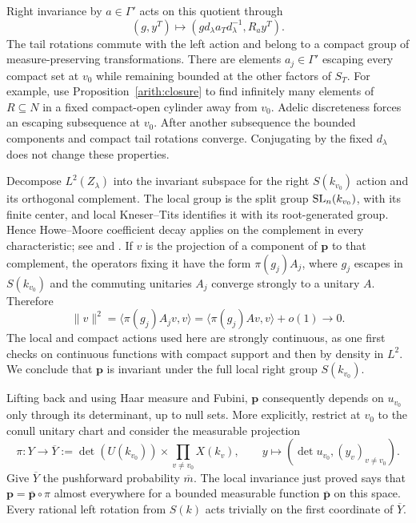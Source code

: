 Right invariance by $a\in\Gamma'$ acts on this quotient through
\[
 (g,y^T)\longmapsto
 (g d_\lambda a_Td_\lambda^{-1},R_a y^T).
\]
The tail rotations commute with the left action and belong to a compact
group of measure-preserving transformations.  There are elements
$a_j\in\Gamma'$ escaping every compact set at $v_0$ while remaining
bounded at the other factors of $S_T$.  For example, use
Proposition~\ref{arith:closure} to find infinitely many elements of
$R\subseteq N$ in a fixed compact-open cylinder away from $v_0$.
Adelic discreteness forces an escaping subsequence at $v_0$.
After another subsequence the bounded components and compact tail
rotations converge.  Conjugating by the fixed $d_\lambda$ does not
change these properties.

Decompose $L^2(Z_\lambda)$ into the invariant subspace for the right
$S(k_{v_0})$ action and its orthogonal complement.  The local group is the split group $\operatorname{SL}_n(k_{v_0})$, with its finite
center, and local Kneser--Tits identifies it with its root-generated
group.  Hence Howe--Moore coefficient decay applies on
the complement in every characteristic; see
\cite{HoweMoore} and \cite[Theorem~4.19]{Ciobotaru}.  If $v$ is the
projection of a component of $\mathbf p$ to that complement, the
operators fixing it have the form $\pi(g_j)A_j$, where $g_j$ escapes
in $S(k_{v_0})$ and the commuting unitaries $A_j$ converge strongly to
a unitary $A$.  Therefore
\[
 \|v\|^2=\langle\pi(g_j)A_jv,v\rangle
 =\langle\pi(g_j)Av,v\rangle+o(1)\longrightarrow0.
\]
The local and compact actions used here are strongly continuous, as
one first checks on continuous functions with compact support and then
by density in $L^2$.  We conclude that $\mathbf p$ is invariant under
the full local right group $S(k_{v_0})$.

Lifting back and using Haar measure and Fubini, $\mathbf p$ consequently
depends on $u_{v_0}$ only through its determinant, up to null sets.
More explicitly, restrict at $v_0$ to the conull unitary chart and
consider the measurable projection
\[
 \pi:Y\longrightarrow\overline Y
   :=\det(U(k_{v_0}))\times\prod_{v\ne v_0}X(k_v),\qquad
 y\longmapsto(\det u_{v_0},(y_v)_{v\ne v_0}).
\]
Give $\overline Y$ the pushforward probability $\overline m$.
The local invariance just proved says that
$\mathbf p=\overline{\mathbf p}\circ\pi$ almost everywhere for a
bounded measurable function $\overline{\mathbf p}$ on this space.
Every rational left rotation from $S(k)$ acts trivially on the first
coordinate of $\overline Y$.


